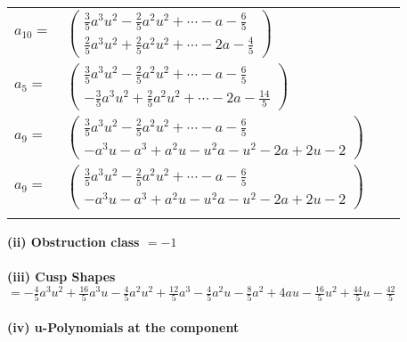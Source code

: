 \documentclass[1p]{elsarticle_modified}
\theoremstyle{definition}
\begin{document}
\begin{tabular}{m{7pt} m{180pt} m{7pt} m{180pt} }
\flushright $a_{10}=$&$\begin{pmatrix}\frac{3}{5} a^3 u^2-\frac{2}{5} a^2 u^2+\cdots- a-\frac{6}{5}\\\frac{2}{5} a^3 u^2+\frac{2}{5} a^2 u^2+\cdots-2 a-\frac{4}{5}\end{pmatrix}$ \\
\flushright $a_{5}=$&$\begin{pmatrix}\frac{3}{5} a^3 u^2-\frac{2}{5} a^2 u^2+\cdots- a-\frac{6}{5}\\-\frac{3}{5} a^3 u^2+\frac{2}{5} a^2 u^2+\cdots-2 a-\frac{14}{5}\end{pmatrix}$ \\
\flushright $a_{9}=$&$\begin{pmatrix}\frac{3}{5} a^3 u^2-\frac{2}{5} a^2 u^2+\cdots- a-\frac{6}{5}\\- a^3 u- a^3+a^2 u- u^2 a- u^2-2 a+2 u-2\end{pmatrix}$\\ \flushright $a_{9}=$&$\begin{pmatrix}\frac{3}{5} a^3 u^2-\frac{2}{5} a^2 u^2+\cdots- a-\frac{6}{5}\\- a^3 u- a^3+a^2 u- u^2 a- u^2-2 a+2 u-2\end{pmatrix}$\\&\end{tabular}
\flushleft \textbf{(ii) Obstruction class $= -1$}\\~\\
\flushleft \textbf{(iii) Cusp Shapes $= -\frac{4}{5} a^3 u^2+\frac{16}{5} a^3 u-\frac{4}{5} a^2 u^2+\frac{12}{5} a^3-\frac{4}{5} a^2 u-\frac{8}{5} a^2+4 a u-\frac{16}{5} u^2+\frac{44}{5} u-\frac{42}{5}$}\\~\\
\newpage\renewcommand{\arraystretch}{1}
\flushleft \textbf{(iv) u-Polynomials at the component}\newline \\
\end{document}
